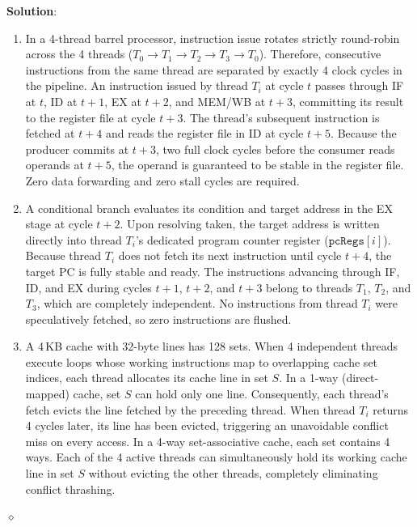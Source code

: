 \begin{problem}
\textbf{Solution}:
\begin{enumerate}
    \item In a 4-thread barrel processor, instruction issue rotates strictly round-robin across the 4 threads ($T_0 \to T_1 \to T_2 \to T_3 \to T_0$). Therefore, consecutive instructions from the same thread are separated by exactly 4 clock cycles in the pipeline. An instruction issued by thread $T_i$ at cycle $t$ passes through IF at $t$, ID at $t+1$, EX at $t+2$, and MEM/WB at $t+3$, committing its result to the register file at cycle $t+3$. The thread's subsequent instruction is fetched at $t+4$ and reads the register file in ID at cycle $t+5$. Because the producer commits at $t+3$, two full clock cycles before the consumer reads operands at $t+5$, the operand is guaranteed to be stable in the register file. Zero data forwarding and zero stall cycles are required.
    \item A conditional branch evaluates its condition and target address in the EX stage at cycle $t+2$. Upon resolving taken, the target address is written directly into thread $T_i$'s dedicated program counter register ($\texttt{pcRegs}[i]$). Because thread $T_i$ does not fetch its next instruction until cycle $t+4$, the target PC is fully stable and ready. The instructions advancing through IF, ID, and EX during cycles $t+1$, $t+2$, and $t+3$ belong to threads $T_1$, $T_2$, and $T_3$, which are completely independent. No instructions from thread $T_i$ were speculatively fetched, so zero instructions are flushed.
    \item A 4\,KB cache with 32-byte lines has 128 sets. When 4 independent threads execute loops whose working instructions map to overlapping cache set indices, each thread allocates its cache line in set $S$. In a 1-way (direct-mapped) cache, set $S$ can hold only one line. Consequently, each thread's fetch evicts the line fetched by the preceding thread. When thread $T_i$ returns 4 cycles later, its line has been evicted, triggering an unavoidable conflict miss on every access. In a 4-way set-associative cache, each set contains 4 ways. Each of the 4 active threads can simultaneously hold its working cache line in set $S$ without evicting the other threads, completely eliminating conflict thrashing.
\end{enumerate}
$\diamond$
\end{problem}
